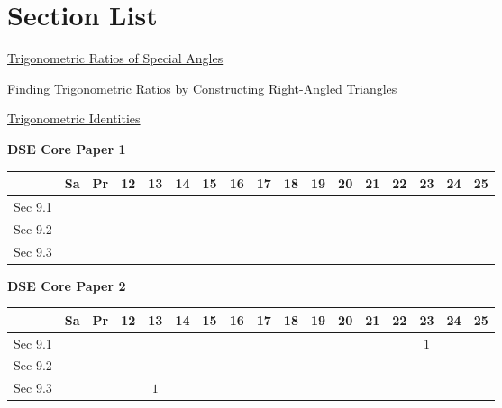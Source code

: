 \documentclass[12pt, a4paper]{article}
\begin{document}
\section*{Section List}
\begin{enumx}[label=Sec 9.\arabic*\ ]
\item \hyperref[section:3-9-1]{Trigonometric Ratios of Special Angles}
\item \hyperref[section:3-9-2]{Finding Trigonometric Ratios by Constructing Right-Angled Triangles}
\item \hyperref[section:3-9-3]{Trigonometric Identities}
\end{enumx}
\begin{absolutelynopagebreak}
\begin{center}
\textbf{DSE Core Paper 1}
\end{center}
\begin{center}
\begin{tabular}{|l|c|c|c|c|c|c|c|c|c|c|c|c|c|c|c|c|}
\hline
        & Sa & Pr & 12 & 13 & 14 & 15 & 16 & 17 & 18 & 19 & 20 & 21 & 22 & 23 & 24 & 25 \\\hline\hline
Sec 9.1 &  &  &  &  &  &  &  &  &  &  &  &  &  &  &  &  \\\hline
Sec 9.2 &  &  &  &  &  &  &  &  &  &  &  &  &  &  &  &  \\\hline
Sec 9.3 &  &  &  &  &  &  &  &  &  &  &  &  &  &  &  &  \\\hline
\end{tabular}
\end{center}
\end{absolutelynopagebreak}
\begin{absolutelynopagebreak}
\begin{center}
\textbf{DSE Core Paper 2}
\end{center}
\begin{center}
\begin{tabular}{|l|c|c|c|c|c|c|c|c|c|c|c|c|c|c|c|c|}
\hline
        & Sa & Pr & 12 & 13 & 14 & 15 & 16 & 17 & 18 & 19 & 20 & 21 & 22 & 23 & 24 & 25 \\\hline\hline
Sec 9.1 &  &  &  &  &  &  &  &  &  &  &  &  &  &  $1$ &  &  \\\hline
Sec 9.2 &  &  &  &  &  &  &  &  &  &  &  &  &  &  &  &  \\\hline
Sec 9.3 &  &  &  &  $1$ &  &  &  &  &  &  &  &  &  &  &  &  \\\hline
\end{tabular}
\end{center}
\end{absolutelynopagebreak}
\end{document}
